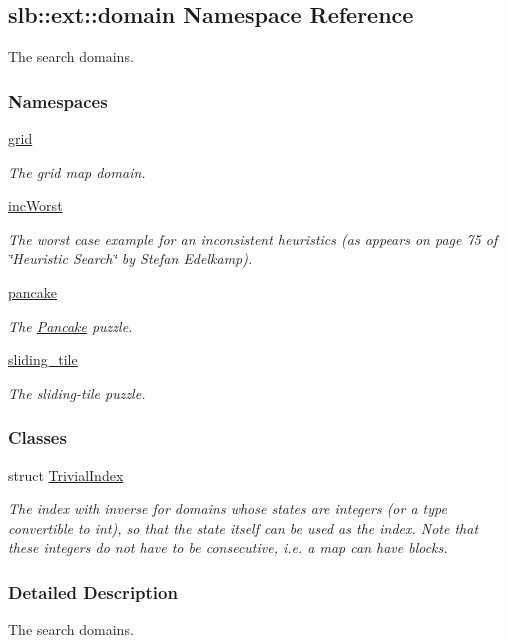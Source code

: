 \hypertarget{namespaceslb_1_1ext_1_1domain}{}\subsection{slb\+:\+:ext\+:\+:domain Namespace Reference}
\label{namespaceslb_1_1ext_1_1domain}


The search domains.  


\subsubsection*{Namespaces}
\begin{DoxyCompactItemize}
\item 
 \hyperlink{namespaceslb_1_1ext_1_1domain_1_1grid}{grid}
\begin{DoxyCompactList}\small\item\em The grid map domain. \end{DoxyCompactList}\item 
 \hyperlink{namespaceslb_1_1ext_1_1domain_1_1incWorst}{inc\+Worst}
\begin{DoxyCompactList}\small\item\em The worst case example for an inconsistent heuristics (as appears on page 75 of \char`\"{}\+Heuristic Search\char`\"{} by Stefan Edelkamp). \end{DoxyCompactList}\item 
 \hyperlink{namespaceslb_1_1ext_1_1domain_1_1pancake}{pancake}
\begin{DoxyCompactList}\small\item\em The \hyperlink{structslb_1_1ext_1_1domain_1_1pancake_1_1Pancake}{Pancake} puzzle. \end{DoxyCompactList}\item 
 \hyperlink{namespaceslb_1_1ext_1_1domain_1_1sliding__tile}{sliding\+\_\+tile}
\begin{DoxyCompactList}\small\item\em The sliding-\/tile puzzle. \end{DoxyCompactList}\end{DoxyCompactItemize}
\subsubsection*{Classes}
\begin{DoxyCompactItemize}
\item 
struct \hyperlink{structslb_1_1ext_1_1domain_1_1TrivialIndex}{Trivial\+Index}
\begin{DoxyCompactList}\small\item\em The index with inverse for domains whose states are integers (or a type convertible to int), so that the state itself can be used as the index. Note that these integers do not have to be consecutive, i.\+e. a map can have blocks. \end{DoxyCompactList}\end{DoxyCompactItemize}


\subsubsection{Detailed Description}
The search domains. 